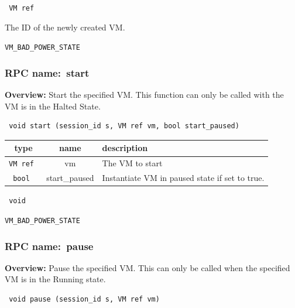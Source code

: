 {\tt 
VM ref
}


The ID of the newly created VM.
\vspace{0.3cm}

 {\tt VM\_BAD\_POWER\_STATE}

\vspace{0.6cm}
\subsubsection{RPC name:~start}

{\bf Overview:} 
Start the specified VM.  This function can only be called with the VM is in
the Halted State.

\begin{verbatim} void start (session_id s, VM ref vm, bool start_paused)\end{verbatim}



 
\vspace{0.3cm}
\begin{tabular}{|c|c|p{7cm}|}
 \hline
{\bf type} & {\bf name} & {\bf description} \\ \hline
{\tt VM ref } & vm & The VM to start \\ \hline 

{\tt bool } & start\_paused & Instantiate VM in paused state if set to true. \\ \hline 

\end{tabular}

\vspace{0.3cm}

{\tt 
void
}



\vspace{0.3cm}

 {\tt VM\_BAD\_POWER\_STATE}

\vspace{0.6cm}
\subsubsection{RPC name:~pause}

{\bf Overview:} 
Pause the specified VM. This can only be called when the specified VM is in
the Running state.

\begin{verbatim} void pause (session_id s, VM ref vm)\end{verbatim}


